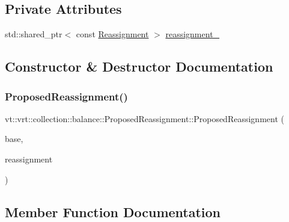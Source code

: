 \subsection*{Private Attributes}
\begin{DoxyCompactItemize}
\item 
std\+::shared\+\_\+ptr$<$ const \hyperlink{structvt_1_1vrt_1_1collection_1_1balance_1_1_reassignment}{Reassignment} $>$ \hyperlink{structvt_1_1vrt_1_1collection_1_1balance_1_1_proposed_reassignment_a923fcc247c401b766417f1e87009cb00}{reassignment\+\_\+}
\end{DoxyCompactItemize}


\subsection{Constructor \& Destructor Documentation}
\mbox{\label{structvt_1_1vrt_1_1collection_1_1balance_1_1_proposed_reassignment_a8c678464bec1fa46e24c69be66a45220}} 
\subsubsection{\texorpdfstring{Proposed\+Reassignment()}{ProposedReassignment()}}
{\footnotesize\ttfamily vt\+::vrt\+::collection\+::balance\+::\+Proposed\+Reassignment\+::\+Proposed\+Reassignment (\begin{DoxyParamCaption}\item[{std\+::shared\+\_\+ptr$<$ \hyperlink{structvt_1_1vrt_1_1collection_1_1balance_1_1_load_model}{balance\+::\+Load\+Model} $>$}]{base,  }\item[{std\+::shared\+\_\+ptr$<$ const \hyperlink{structvt_1_1vrt_1_1collection_1_1balance_1_1_reassignment}{Reassignment} $>$}]{reassignment }\end{DoxyParamCaption})}



\subsection{Member Function Documentation}
\mbox{\label{structvt_1_1vrt_1_1collection_1_1balance_1_1_proposed_reassignment_ad7a65c6be802368df458f6005ef69d23}} 
